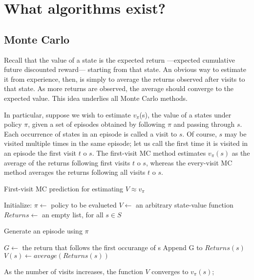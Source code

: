 \documentclass[letterpaper, 10 pt]{IEEEconf}
\begin{document}
\section{What algorithms exist?}

\subsection{Monte Carlo}

Recall that the value of a state is the expected return —expected cumulative future discounted reward— starting from that state. An obvious way to estimate it from experience, then, is simply to average the returns observed after visits to that state. As more returns are observed, the average should converge to the expected value. This idea underlies all Monte Carlo methods.

In particular, suppose we wish to estimate $v_\pi$(s), the value of a
states under policy $\pi$, given a set of episodes obtained by
following $\pi$ and passing through $s$. Each occurrence of states in an
episode is called a visit to $s$. Of course, $s$ may be visited multiple
times in the same episode; let us call the first time it is visited in
an episode the first visit $t$ o $s$. The first-visit MC method estimates
$v_\pi(s)$ as the average of the returns following first visits $t$ o $s$,
whereas the every-visit MC method averages the returns following all
visits $t$ o $s$.


\begin{algorithm}
\caption{First-visit MC prediction for estimating $V \approx v_{\pi}$}
\begin{algorithmic}[1]

  \State Initialize:
  \State $\pi \leftarrow$ policy to be evalueted
  \State $V \leftarrow$ an arbitrary state-value function
  \State $Returns \leftarrow$ an empty list, for all $s \in \mathit{S}$

  \State Generate an episode using $\pi$


  \State $G \leftarrow$ the return that follows the first occurange of s
  \State Append G to $Returns(s)$
  \State $V(s) \leftarrow average(Returns(s))$
    \EndFor
    \EndWhile

\end{algorithmic}
\end{algorithm}


As the number of visits increases, the function $V$ converges to $v_\pi(s)$;
\end{document}
